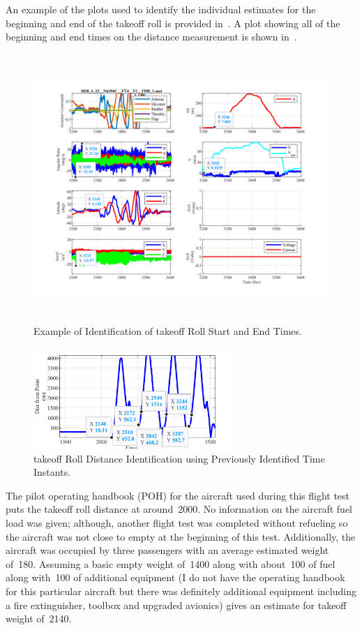 \documentclass[conf]{new-aiaa}
\begin{document}
An example of the plots used to identify the individual estimates for the beginning and end of the takeoff roll is provided in~. A plot showing all of the beginning and end times on the distance measurement is shown in~.

\begin{figure}[htp!]
\centering
	\includegraphics[height=4in]{TakeoffRollTimeID.png}
	\caption{Example of Identification of takeoff Roll Start and End Times.}
	\label{timeid}
\end{figure}

\begin{figure}[htp!]
\centering
	\includegraphics[height=1.5in]{TakeoffRollDistID.png}
	\caption{takeoff Roll Distance Identification using Previously Identified Time Instants.}
	\label{distanceid}
\end{figure}

The pilot operating handbook (POH) for the aircraft used during this flight test puts the takeoff roll distance at around~\SI{2000}{\foot}. No information on the aircraft fuel load was given; although, another flight test was completed without refueling so the aircraft was not close to empty at the beginning of this test. Additionally, the aircraft was occupied by three passengers with an average estimated weight of~\SI{180}{\poundforce}. Assuming a basic empty weight of~\SI{1400}{\poundforce} along with about~\SI{100}{\poundforce} of fuel along with~\SI{100}{\poundforce} of additional equipment (I do not have the operating handbook for this particular aircraft but there was definitely additional equipment including a fire extinguisher, toolbox and upgraded avionics) gives an estimate for takeoff weight of~\SI{2140}{\poundforce}.
\end{document}
